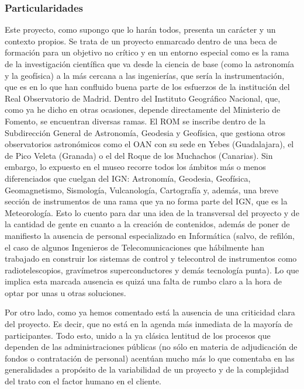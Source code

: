 \subsubsection{Particularidades}
\par Este proyecto, como supongo que lo harán todos, presenta un carácter y un contexto propios. Se trata de un proyecto enmarcado dentro de una beca de formación para un objetivo no crítico y en un entorno especial como es la rama de la investigación científica que va desde la ciencia de base (como la astronomía y la geofísica) a la más cercana a las ingenierías, que sería la instrumentación, que es en lo que han confluido buena parte de los esfuerzos de la institución del Real Observatorio de Madrid. Dentro del Instituto Geográfico Nacional, que, como ya he dicho en otras ocasiones, depende directamente del Ministerio de Fomento, se encuentran diversas ramas. El ROM se inscribe dentro de la Subdirección General de Astronomía, Geodesia y Geofísica, que gestiona otros observatorios astronómicos como el OAN con su sede en Yebes (Guadalajara), el de Pico Veleta (Granada) o el del Roque de los Muchachos (Canarias). Sin embargo, lo expuesto en el museo recorre todos los ámbitos más o menos diferenciados que cuelgan del IGN: Astronomía, Geodesia, Geofísica, Geomagnetismo, Sismología, Vulcanología, Cartografía y, además, una breve sección de instrumentos de una rama que ya no forma parte del IGN, que es la Meteorología. Esto lo cuento para dar una idea de la transversal del proyecto y de la cantidad de gente en cuanto a la creación de contenidos, además de poner de manifiesto la ausencia de personal especializado en Informática (salvo, de refilón, el caso de algunos Ingenieros de Telecomunicaciones que hábilmente han trabajado en construir los sistemas de control y telecontrol de instrumentos como radiotelescopios, gravímetros superconductores y demás tecnología punta). Lo que implica esta marcada ausencia es quizá una falta de rumbo claro a la hora de optar por unas u otras soluciones.
\par Por otro lado, como ya hemos comentado está la ausencia de una criticidad clara del proyecto. Es decir, que no está en la agenda más inmediata de la mayoría de participantes. Todo esto, unido a la ya clásica lentitud de los procesos que dependen de las administraciones públicas (no sólo en materia de adjudicación de fondos o contratación de personal) acentúan mucho más lo que comentaba en las generalidades a propósito de la variabilidad de un proyecto y de la complejidad del trato con el factor humano en el cliente.

